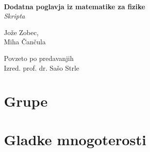 \documentclass[a4paper]{book}
\begin{document}
\begin{titlepage}
	\begin{center}
	\ \\[5cm]
	\LARGE{\bf Dodatna poglavja iz matematike za fizike}\\[0.5cm]
	\large{\it Skripta}\\[3cm]
	\begin{minipage}{0.4\textwidth}\small
		\begin{flushleft}
			\large{Jo\v ze Zobec,}\\[0.5cm]
			\large{Miha \v Can\v cula}
		\end{flushleft}
	\end{minipage}
	\begin{minipage}{0.4\textwidth}\small
		\begin{flushright}
			\large{\sc Povzeto po predavanjih}\\[0.5cm]
			\large{Izred. prof. dr. Sa\v so Strle}
		\end{flushright}
	\end{minipage}
	\end{center}
\end{titlepage}



\part{Grupe}







\part{Gladke mnogoterosti}




\end{document}

